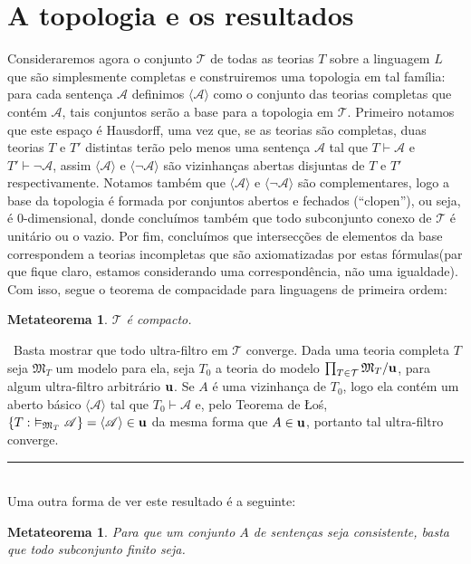\documentclass[11pt,a4paper]{article}
\newtheorem{mthrm}[mydef]{Metateorema}
\def\dem{\par\smallbreak\noindent {\textit{ Demonstração:}} \ }
\def\eop{\hfill\rule{2.5mm}{2.5mm} \\ }
\theoremstyle{definition}
\begin{document}
\section{A topologia e os resultados}

Consideraremos agora o conjunto $\mathcal{T}$ de todas as teorias $T$ sobre a linguagem $L$ que são simplesmente completas e construiremos uma topologia em tal família: para cada sentença $\mathscr{A}$ definimos $\langle \mathscr{A} \rangle$ como o conjunto das teorias completas que contém $\mathscr{A}$, tais conjuntos serão a base para a topologia em $\mathcal{T}$. Primeiro notamos que este espaço é Hausdorff, uma vez que, se as teorias são completas, duas teorias $T$ e $T'$ distintas terão pelo menos uma sentença $\mathscr{A}$ tal que $T\vdash \mathscr{A}$ e $T'\vdash\neg \mathscr{A}$, assim $\langle \mathscr{A} \rangle$ e $\langle\neg \mathscr{A} \rangle$ são vizinhanças abertas disjuntas de $T$ e $T'$ respectivamente. Notamos também que $\langle \mathscr{A} \rangle$ e $\langle\neg \mathscr{A} \rangle$ são complementares, logo a base da topologia é formada por conjuntos abertos e fechados (``clopen''), ou seja, é $0$-dimensional, donde concluímos também que todo subconjunto conexo de $\mathcal{T}$ é unitário ou o vazio. Por fim, concluímos que intersecções de elementos da base correspondem a teorias incompletas que são axiomatizadas por estas fórmulas(par que fique claro, estamos considerando uma correspondência, não uma igualdade). Com isso, segue o teorema de compacidade para linguagens de primeira ordem: 

\begin{mthrm}
	
	$\mathcal{T}$ é compacto. 
	
\end{mthrm}

\dem Basta mostrar que todo ultra-filtro em $\mathcal{T}$ converge. Dada uma teoria completa $T$ seja $\mathfrak{M}_T$ um modelo para ela, seja $T_0$ a teoria do modelo $\prod_{T\in \mathcal{T}} \mathfrak{M}_T/\bf{u}$, para algum ultra-filtro arbitrário $\bf{u}$. Se $A$ é uma vizinhança de $T_0$, logo ela contém um aberto básico $\langle \mathscr{A} \rangle$ tal que $T_0\vdash \mathscr{A}$ e, pelo Teorema de Łoś, $\{T: \ \vDash_{ \mathfrak{M}_T}  \mathscr{A} \}=\langle \mathscr{A} \rangle \in \bf{u}$ da mesma forma que $A\in \bf{u}$, portanto tal ultra-filtro converge. \eop


Uma outra forma de ver este resultado é a seguinte:

\begin{mthrm}
	
	Para que um conjunto $A$ de sentenças seja consistente, basta que todo subconjunto finito seja. 
	
\end{mthrm}
\end{document}
